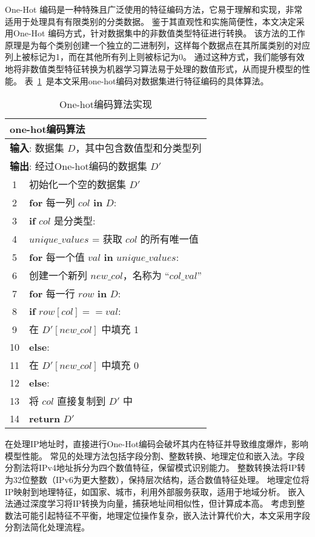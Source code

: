 One-Hot 编码是一种特殊且广泛使用的特征编码方法，它易于理解和实现，非常适用于处理具有有限类别的分类数据。
鉴于其直观性和实施简便性，本文决定采用One-Hot 编码方式，针对数据集中的非数值类型特征进行转换。
该方法的工作原理是为每个类别创建一个独立的二进制列，这样每个数据点在其所属类别的对应列上被标记为1，而在其他所有列上则被标记为0。
通过这种方式，我们能够有效地将非数值类型特征转换为机器学习算法易于处理的数值形式，从而提升模型的性能。
表~\ref{tab:onehot}~是本文采用one-hot编码对数据集进行特征编码的具体算法。\par
\begin{table}[htbp]
  \caption{One-hot编码算法实现}
  \label{tab:onehot}
  \centering
  \begin{tabularx}{1.0\textwidth}{cl}
  \toprule
  \multicolumn{2}{l}{\textbf{one-hot编码算法}}\\
  \midrule
  \multicolumn{2}{l}{\textbf{输入}: 数据集 $D$，其中包含数值型和分类型列} \\ 
  \multicolumn{2}{l}{\textbf{输出}: 经过One-hot编码的数据集 $D'$} \\
  1& 初始化一个空的数据集 $D'$ \\
  2& \textbf{for} 每一列 $col$ \textbf{in} $D$: \\
  3&\quad \textbf{if} $col$ 是分类型: \\
  4&\quad\quad $unique\_values$ = 获取 $col$ 的所有唯一值 \\
  5&\quad\quad \textbf{for} 每一个值 $val$ \textbf{in} $unique\_values$: \\
  6&\quad\quad\quad 创建一个新列 $new\_col$，名称为 ``$col\_val$''\\
  7&\quad\quad\quad \textbf{for} 每一行 $row$ \textbf{in} $D$: \\
  8&\quad\quad\quad\quad \textbf{if} $row[col] == val$: \\
  9&\quad\quad\quad\quad\quad 在 $D'[new\_col]$ 中填充 1 \\
  10&\quad\quad\quad\quad \textbf{else}: \\
  11&\quad\quad\quad\quad\quad 在 $D'[new\_col]$ 中填充 0 \\
  12&\quad \textbf{else}: \\
  13&\quad\quad 将 $col$ 直接复制到 $D'$ 中 \\
  14&\textbf{return} $D'$ \\ 
  \bottomrule
  \end{tabularx}
  \end{table}

在处理IP地址时，直接进行One-Hot编码会破坏其内在特征并导致维度爆炸，影响模型性能。
常见的处理方法包括字段分割、整数转换、地理定位和嵌入法。字段分割法将IPv4地址拆分为四个数值特征，保留模式识别能力。
整数转换法将IP转为32位整数（IPv6为更大整数），保持层次结构，适合数值特征处理。
地理定位将IP映射到地理特征，如国家、城市，利用外部服务获取，适用于地域分析。
嵌入法通过深度学习将IP转换为向量，捕获地址间相似性，但计算成本高。
考虑到整数法可能引起特征不平衡，地理定位操作复杂，嵌入法计算代价大，本文采用字段分割法简化处理流程。

